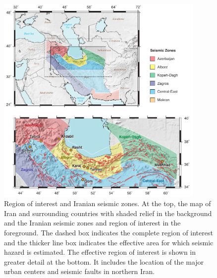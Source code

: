 
\begin{figure}[t]
	\centering
	\includegraphics[width=0.9\textwidth]{figures/pdf/figure-01}
	\caption{Region of interest and Iranian seismic zones. At the top, the map of Iran and surrounding countries with shaded relief in the background and the Iranian seismic zones \citep[after][]{Karimiparidari2013} and region of interest in the foreground. The dashed box indicates the complete region of interest and the thicker line box indicates the effective area for which seismic hazard is estimated. The effective region of interest is shown in greater detail at the bottom. It includes the location of the major urban centers and seismic faults in northern Iran.}
	\label{fig:iran}
\end{figure}

